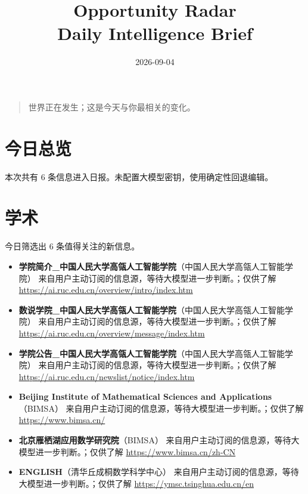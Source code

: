 \documentclass[11pt]{ctexart}
\title{Opportunity Radar\\Daily Intelligence Brief}
\date{2026-09-04}
\begin{document}
\maketitle
\begin{quote}\Large 世界正在发生；这是今天与你最相关的变化。\end{quote}
\section*{今日总览}
本次共有 6 条信息进入日报。未配置大模型密钥，使用确定性回退编辑。
\section*{学术}
今日筛选出 6 条值得关注的新信息。
\begin{itemize}
\item \textbf{学院简介\_中国人民大学高瓴人工智能学院}（中国人民大学高瓴人工智能学院） 来自用户主动订阅的信息源，等待大模型进一步判断。；仅供了解 \url{https://ai.ruc.edu.cn/overview/intro/index.htm}
\item \textbf{数说学院\_中国人民大学高瓴人工智能学院}（中国人民大学高瓴人工智能学院） 来自用户主动订阅的信息源，等待大模型进一步判断。；仅供了解 \url{https://ai.ruc.edu.cn/overview/message/index.htm}
\item \textbf{学院公告\_中国人民大学高瓴人工智能学院}（中国人民大学高瓴人工智能学院） 来自用户主动订阅的信息源，等待大模型进一步判断。；仅供了解 \url{https://ai.ruc.edu.cn/newslist/notice/index.htm}
\item \textbf{Beijing Institute of Mathematical Sciences and Applications}（BIMSA） 来自用户主动订阅的信息源，等待大模型进一步判断。；仅供了解 \url{https://www.bimsa.cn/}
\item \textbf{北京雁栖湖应用数学研究院}（BIMSA） 来自用户主动订阅的信息源，等待大模型进一步判断。；仅供了解 \url{https://www.bimsa.cn/zh-CN}
\item \textbf{ENGLISH}（清华丘成桐数学科学中心） 来自用户主动订阅的信息源，等待大模型进一步判断。；仅供了解 \url{https://ymsc.tsinghua.edu.cn/en}
\end{itemize}
\end{document}
